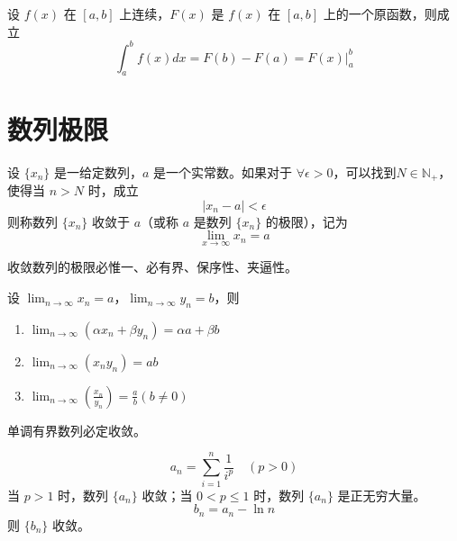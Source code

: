 \documentclass{ctexbook}
\begin{document}
\begin{theorem}[牛顿--莱布尼茨公式]
    设 $f(x)$ 在 $[a,b]$ 上连续，$F(x)$ 是 $f(x)$ 在 $[a,b]$ 上的一个原函数，则成立
    \begin{equation}
        \int_{a}^b f(x)dx=F(b)-F(a)=\left.F(x)\right|_{a}^b
    \end{equation}
\end{theorem}

\chapter{数列极限}

\begin{theorem}[数列极限]
    设 $\{x_n\}$ 是一给定数列，$a$ 是一个实常数。如果对于 $\forall\epsilon>0$，可以找到$N\in\mathbb{N}_+$，使得当 $n>N$ 时，成立
    \begin{equation}
        \lvert x_n-a\rvert<\epsilon
    \end{equation}
    则称数列 $\{x_n\}$ 收敛于 $a$（或称 $a$ 是数列 $\{x_n\}$ 的极限），记为
    \begin{equation}
        \lim_{x\rightarrow\infty}x_n=a
    \end{equation}
\end{theorem}

\begin{theorem}[收敛数列的性质]
    收敛数列的极限必惟一、必有界、保序性、夹逼性。
\end{theorem}

\begin{theorem}[数列极限的四则运算]
    设 $\lim_{n\rightarrow\infty}x_n=a$，$\lim_{n\rightarrow\infty}y_n=b$，则
    \begin{enumerate}
        \item $\lim_{n\rightarrow\infty}(\alpha x_n+\beta y_n)=\alpha a+\beta b$
        \item $\lim_{n\rightarrow\infty}(x_ny_n)=ab$
        \item $\lim_{n\rightarrow\infty}\left(\frac{x_n}{y_n}\right)=\frac{a}{b}(b\neq 0)$
    \end{enumerate}
\end{theorem}

\begin{theorem}[收敛准则]
    单调有界数列必定收敛。
\end{theorem}

\begin{proposition}[黎曼 $\zeta$ 函数]
    \begin{equation}
        a_n=\sum_{i=1}^n \frac{1}{i^p}\quad (p>0)
    \end{equation}
    当 $p>1$ 时，数列 $\{a_n\}$ 收敛；当 $0<p\leq 1$ 时，数列 $\{a_n\}$ 是正无穷大量。
    \begin{equation}
        b_n=a_n - \ln n
    \end{equation}
    则 $\{b_n\}$ 收敛。
\end{proposition}
\end{document}
